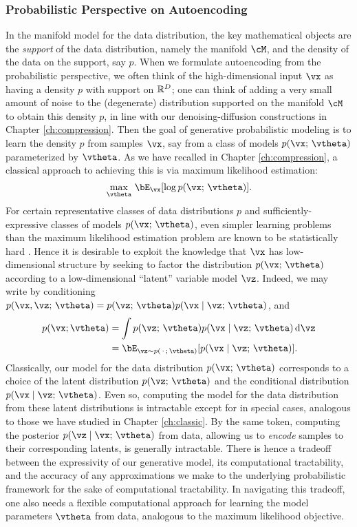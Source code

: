 \documentclass[\toplevelprefix/book-main.tex]{subfiles}
\begin{document}
\subsubsection{Probabilistic Perspective on Autoencoding}
In the manifold model for the data distribution, the key mathematical objects
are the \textit{support} of the data distribution, namely the manifold $\cM$,
and the density of the data on the support, say $p$. When we formulate
autoencoding from the probabilistic perspective, we often think of the
high-dimensional input $\vx$ as having a density $p$ with support on $\mathbb{R}^D$; one
can think of adding a very small amount of noise to the (degenerate)
distribution supported on the manifold $\cM$ to obtain this density $p$, in line
with our denoising-diffusion constructions in Chapter \ref{ch:compression}.
Then the goal of generative probabilistic modeling is to learn the density $p$
from samples $\vx$, say from a class of models $p(\vx;\, \vtheta)$ parameterized
by $\vtheta$. As we have recalled in Chapter \ref{ch:compression}, a classical
approach to achieving this is via maximum likelihood estimation:
\begin{equation*}\label{eq:VAE-MLE}
\max_{\vtheta}\, \bE_{\vx}[ \log p(\vx;\, \vtheta) ].
\end{equation*}
For certain representative classes of data distributions $p$ %
and sufficiently-expressive classes of models $p(\vx;\, \vtheta)$, even simpler
learning problems than the maximum likelihood estimation problem are known to be
statistically hard \cite{Yang1999-wb}. Hence it is desirable to exploit the
knowledge that $\vx$ has low-dimensional structure by seeking to factor the
distribution $p(\vx ;\, \vtheta)$ according to a low-dimensional ``latent''
variable model $\vz$. Indeed, we may write by conditioning $p(\vx,
\vz ;\, \vtheta)
= p(\vz;\, \vtheta) p(\vx \mid \vz;\, \vtheta)$, and
\begin{align*}
p(\vx; \vtheta) &= \int p(\vz;\, \vtheta) p(\vx \mid \vz;\, \vtheta) \odif \vz
\\
&=
\bE_{\vz \sim p(\,\cdot\,;\, \vtheta)}[ p(\vx \mid \vz;\, \vtheta) ].
\end{align*}
Classically, our model for the data distribution $p(\vx;\, \vtheta)$ corresponds
to a choice of the latent distribution $p(\vz;\, \vtheta)$ and the conditional
distribution $p(\vx \mid \vz;\, \vtheta)$.
Even so, computing the model for the data distribution from these latent
distributions is intractable except for in special cases, analogous to those we
have studied in Chapter \ref{ch:classic}.
By the same token, computing the posterior $p(\vz \mid \vx;\, \vtheta)$ from
data, allowing us to \textit{encode} samples to their corresponding latents, is
generally intractable.
There is hence a tradeoff between the expressivity of our generative model,
its computational tractability, and the accuracy of any approximations we make
to the underlying probabilistic framework for the sake of
computational tractability.
In navigating this tradeoff, one also needs a flexible computational approach
for learning the model parameters $\vtheta$ from data, analogous to the maximum
likelihood objective.
\end{document}
